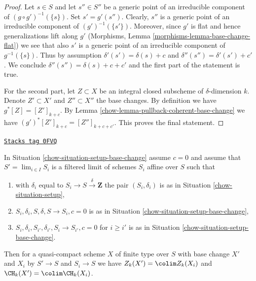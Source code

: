 \begin{proof}

Let $s \in S$ and let $s'' \in S''$ be a generic point of an irreducible
component of $(g \circ g')^{-1}(\{s\})$. Set $s' = g'(s'')$.
Clearly, $s''$ is a generic point of an irreducible component of
$(g')^{-1}(\{s'\})$. Moreover, since $g'$ is flat and hence generalizations
lift along $g'$ (Morphisms, Lemma \ref{morphisms-lemma-base-change-flat})
we see that also $s'$ is a generic point of an irreducible component
of $g^{-1}(\{s\})$. Thus by assumption $\delta'(s') = \delta(s) + c$
and $\delta''(s'') = \delta'(s') + c'$. We conclude
$\delta''(s'') = \delta(s) + c + c'$ and the first part of the
statement is true.

\medskip\noindent
For the second part, let $Z \subset X$ be an integral closed subscheme
of $\delta$-dimension $k$. Denote $Z' \subset X'$ and $Z'' \subset X''$
the base changes. By definition we have $g^*[Z] = [Z']_{k + c}$.
By Lemma \ref{chow-lemma-pullback-coherent-base-change} we have
$(g')^*[Z']_{k + c} = [Z'']_{k + c + c'}$. This proves the final statement.
\end{proof}

\begin{lemma}
\label{chow-lemma-chow-limit}
\href{https://stacks.math.columbia.edu/tag/0FVQ}{\texttt{Stacks tag 0FVQ}}

In Situation \ref{chow-situation-setup-base-change} assume $c = 0$
and assume that $S' = \lim_{i \in I} S_i$ is a filtered limit
of schemes $S_i$ affine over $S$ such that
\begin{enumerate}
\item with $\delta_i$ equal to $S_i \to S \xrightarrow{\delta} \mathbf{Z}$
the pair $(S_i, \delta_i)$ is as in Situation \ref{chow-situation-setup},
\item $S_i, \delta_i, S, \delta, S \to S_i, c = 0$ is as in
Situation \ref{chow-situation-setup-base-change},
\item $S_i, \delta_i, S_{i'}, \delta_{i'}, S_i \to S_{i'}, c = 0$
for $i \geq i'$ is as in Situation \ref{chow-situation-setup-base-change}.
\end{enumerate}
Then for a quasi-compact scheme $X$ of finite type over $S$
with base change $X'$ and $X_i$ by $S' \to S$ and $S_i \to S$ we have
$Z_k(X') = \colim Z_k(X_i)$ and $\CH_k(X') = \colim \CH_k(X_i)$.
\end{lemma}

